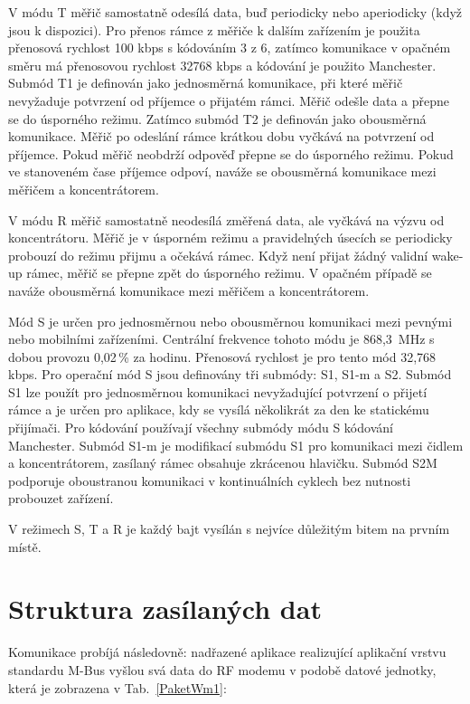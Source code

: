 V	módu T měřič samostatně odesílá data, buď periodicky nebo aperiodicky (když jsou k dispozici). Pro přenos rámce z měřiče k dalším zařízením je použita přenosová rychlost 100 kbps s kódováním 3 z 6, zatímco komunikace v opačném směru má přenosovou rychlost 32768 kbps a kódování je použito Manchester. Submód T1 je definován jako jednosměrná komunikace, při které měřič nevyžaduje potvrzení od příjemce o přijatém rámci. Měřič odešle data a přepne se do úsporného režimu. Zatímco submód T2 je definován jako obousměrná komunikace. Měřič po odeslání rámce krátkou dobu vyčkává na potvrzení od příjemce. Pokud měřič neobdrží odpověď přepne se do úsporného režimu. Pokud ve stanoveném čase příjemce odpoví, naváže se obousměrná komunikace mezi měřičem a koncentrátorem.


V	módu R měřič samostatně neodesílá změřená data, ale vyčkává na výzvu od koncentrátoru. Měřič je v úsporném režimu a pravidelných úsecích se periodicky probouzí do režimu přijmu a očekává rámec. Když není přijat žádný validní wake-up rámec, měřič se přepne zpět do úsporného režimu. V	opačném případě se naváže obousměrná komunikace mezi měřičem a koncentrátorem.


Mód S je určen pro jednosměrnou nebo obousměrnou komunikaci mezi pevnými nebo mobilními zařízeními. Centrální frekvence tohoto módu je 868,3\, MHz s dobou provozu 0,02\,\% za hodinu. Přenosová rychlost je pro tento mód 32,768\,kbps. Pro operační mód S jsou definovány tři submódy: S1, S1-m a S2. Submód S1 lze použít pro jednosměrnou komunikaci nevyžadující potvrzení o přijetí rámce a je určen pro aplikace, kdy se vysílá několikrát za den ke statickému přijímači. Pro kódování používají všechny submódy módu S kódování Manchester.  
Submód S1-m je modifikací submódu S1 pro komunikaci mezi čidlem a koncentrátorem, zasílaný rámec obsahuje zkrácenou hlavičku.
Submód S2M podporuje oboustranou komunikaci v kontinuálních cyklech bez nutnosti probouzet zařízení.

V režimech S, T a R je každý bajt vysílán s nejvíce důležitým bitem na prvním místě.



\section{Struktura zasílaných dat}
Komunikace probíjá následovně: nadřazené aplikace realizující aplikační vrstvu standardu M-Bus vyšlou svá data do RF modemu v podobě datové jednotky, která je zobrazena v Tab.~\ref{PaketWm1}:

